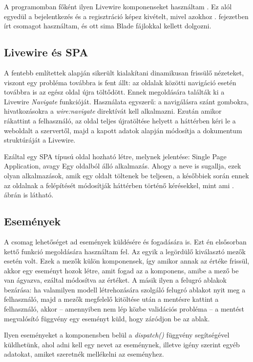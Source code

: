 \documentclass[
]{thesis-ekf}
\theoremstyle{definition}
\theoremstyle{remark}
\begin{document}
A programomban főként ilyen Livewire komponenseket használtam . Ez alól egyedül a bejelentkezés és a regisztráció képez kivételt, mivel azokhoz . fejezetben írt csomagot használtam, és ott sima Blade fájlokkal kellett dolgozni.

\subsection{Livewire és SPA}

A fentebb említettek alapján sikerült kialakítani dinamikusan frissülő nézeteket, viszont egy probléma továbbra is fent állt: az oldalak közötti navigáció esetén továbbra is az egész oldal újra töltődött. Ennek megoldására találták ki a Livewire \emph{Navigate}\cite{navigate} funkcióját. Használata egyszerű: a navigálásra szánt gombokra, hivatkozásokra a \emph{wire:navigate} direktívát kell alkalmazni. Ezután amikor rákattint a felhasználó, az oldal teljes újratöltése helyett a háttérben kéri le a weboldalt a szervertől, majd a kapott adatok alapján módosítja a dokumentum struktúráját a Livewire.

Ezáltal egy SPA típusú oldal hozható létre, melynek jelentése: Single Page Application, avagy Egy oldalból álló alkalmazás. Ahogy a neve is sugallja, ezek olyan alkalmazások, amik egy oldalt töltenek be teljesen, a későbbiek során ennek az oldalnak a felépítését módosítják háttérben történő kérésekkel, mint ami . ábrán is látható.\cite{spa}

\subsection{Események}
\label{livewireevents}
A csomag lehetőséget ad események küldésére és fogadására is. Ezt én elsősorban kettő funkció megoldására használtam fel. Az egyik a legördülő kiválasztó mezők esetén volt. Ezek a mezők külön komponensek, így amikor annak az értéke frissül, akkor egy eseményt hozok létre, amit fogad az a komponens, amibe a mező be van ágyazva, ezáltal módosítva az értéket. A másik ilyen a felugró ablakok bezárása: ha valamilyen modell létrehozására szolgáló felugró ablakot nyit meg a felhasználó, majd a mezők megfelelő kitöltése után a mentésre kattint a felhasználó, akkor -- amennyiben nem lép közbe validációs probléma -- a mentést megvalósító függvény egy eseményt küld, hogy záródjon be az ablak.

Ilyen eseményeket a komponensben belül a \emph{dispatch()} függvény segítségével küldhetünk, ahol adni kell egy nevet az eseménynek, illetve igény szerint egyéb adatokat, amiket szeretnék mellékelni az eseményhez.
\end{document}

